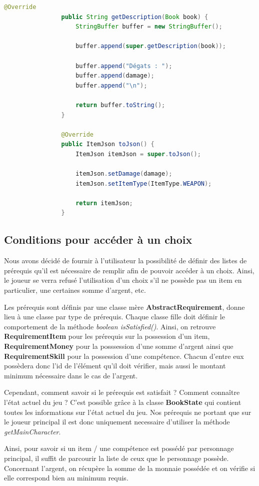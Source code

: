 			\begin{lstlisting}[gobble=16, language=Java, caption=Exemple de spécialisation des items]
				@Override
				public String getDescription(Book book) {
					StringBuffer buffer = new StringBuffer();

					buffer.append(super.getDescription(book));

					buffer.append("Dégats : ");
					buffer.append(damage);
					buffer.append("\n");

					return buffer.toString();
				}

				@Override
				public ItemJson toJson() {
					ItemJson itemJson = super.toJson();

					itemJson.setDamage(damage);
					itemJson.setItemType(ItemType.WEAPON);

					return itemJson;
				}
			\end{lstlisting}

		\subsection{Conditions pour accéder à un choix}

			Nous avons décidé de fournir à l'utilisateur la possibilité de définir des listes de prérequis qu'il est nécessaire de remplir afin de pouvoir accéder à un choix. Ainsi, le joueur se verra refusé l'utilisation d'un choix s'il ne possède pas un item en particulier, une certaines somme d'argent, etc.

			Les prérequis sont définis par une classe mère \textbf{AbstractRequirement}, donne lieu à une classe par type de prérequis. Chaque classe fille doit définir le comportement de la méthode \textit{boolean isSatisfied()}. Ainsi, on retrouve \textbf{RequirementItem} pour les prérequis sur la possession d'un item, \textbf{RequirementMoney} pour la posssession d'une somme d'argent ainsi que \textbf{RequirementSkill} pour la possession d'une compétence. Chacun d'entre eux possèdera donc l'id de l'élément qu'il doit vérifier, mais aussi le montant minimum nécessaire dans le cas de l'argent.

			Cependant, comment savoir si le prérequis est satisfait ? Comment connaître l'état actuel du jeu ? C'est possible grâce à la classe \textbf{BookState} qui contient toutes les informations sur l'état actuel du jeu. Nos prérequis ne portant que sur le joueur principal il est donc uniquement necessaire d'utiliser la méthode \textit{getMainCharacter}.

			Ainsi, pour savoir si un item / une compétence est possédé par personnage principal, il suffit de parcourir la liste de ceux que le personnage possède. Concernant l'argent, on récupère la somme de la monnaie possédée et on vérifie si elle correspond bien au minimum requis.

